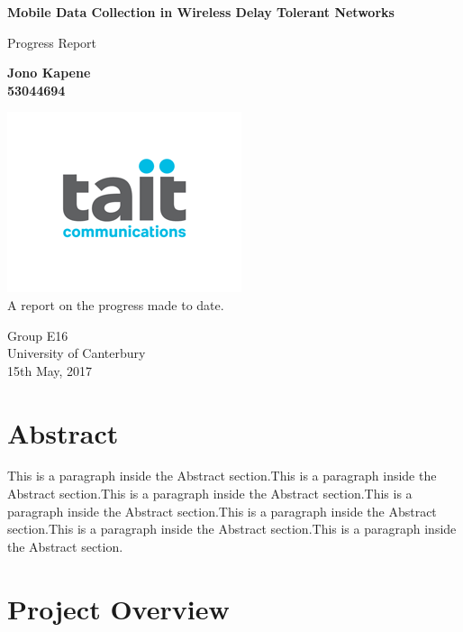 \documentclass[a4paper,12pt]{article}
\begin{document}
	\begin{titlepage}
    		\begin{center}
        		\vspace*{1cm}
        
        		\textbf{Mobile Data Collection in Wireless Delay Tolerant Networks}
        
        		\vspace{0.5cm}
        		Progress Report
        
        		\vspace{1.5cm}
        
        		\textbf{Jono Kapene \\ 53044694}
        
        		\vfill
        		\includegraphics[scale=0.8]{Tait-Communications-logo.png}\\
        		A report on the progress made to date.
        		
        		\vspace{0.8cm}
        
        		Group E16\\
        		University of Canterbury\\
        		15th May, 2017
        
    \end{center}
\end{titlepage}
	\clearpage
	\tableofcontents
	\clearpage
	
	
\section{Abstract}
This is a paragraph inside the Abstract section.This is a paragraph inside the Abstract section.This is a paragraph inside the Abstract section.This is a paragraph inside the Abstract section.This is a paragraph inside the Abstract section.This is a paragraph inside the Abstract section.This is a paragraph inside the Abstract section.
\clearpage

\section{Project Overview}
\end{document}

